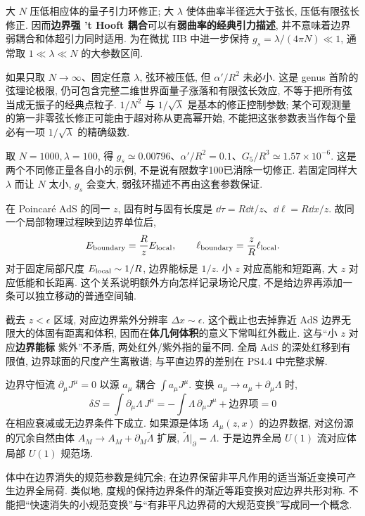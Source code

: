 大 $N$ 压低相应体的量子引力环修正; 大 $\lambda$ 使体曲率半径远大于弦长, 压低有限弦长修正. 因而\textbf{边界强 't Hooft 耦合}可以有\textbf{弱曲率的经典引力描述}, 并不意味着边界弱耦合和体超引力同时适用. 为在微扰 IIB 中进一步保持 $g_s=\lambda/(4\pi N)\ll1$, 通常取 $1\ll\lambda\ll N$ 的大参数区间.

如果只取 $N\to\infty$、固定任意 $\lambda$, 弦环被压低, 但 $\alpha'/R^2$ 未必小. 这是 genus 首阶的弦理论极限, 仍可包含完整二维世界面量子涨落和有限弦长效应, 不等于把所有弦当成无振子的经典点粒子. $1/N^2$ 与 $1/\sqrt\lambda$ 是基本的修正控制参数; 某个可观测量的第一非零弦长修正可能由于超对称从更高幂开始, 不能把这张参数表当作每个量必有一项 $1/\sqrt\lambda$ 的精确级数.

\begin{example}
取 $N=1000,\lambda=100$, 得 $g_s\simeq0.00796$、$\alpha'/R^2=0.1$、$G_5/R^3\simeq1.57\times10^{-6}$. 这是两个不同修正量各自小的示例, 不是说有限数字100已消除一切修正. 若固定同样大 $\lambda$ 而让 $N$ 太小, $g_s$ 会变大, 弱弦环描述不再由这套参数保证.
\end{example}

在 Poincaré AdS 的同一 $z$, 固有时与固有长度是 $\dd\tau=R\dd t/z$、$\dd\ell=R\dd x/z$. 故同一个局部物理过程映到边界单位后,
\[
E_{\rm boundary}=\frac RzE_{\rm local},\qquad
\ell_{\rm boundary}=\frac zR\ell_{\rm local}.
\]
对于固定局部尺度 $E_{\rm local}\sim1/R$, 边界能标是 $1/z$. 小 $z$ 对应高能和短距离, 大 $z$ 对应低能和长距离. 这个关系说明额外方向怎样记录场论尺度, 不是给边界再添加一条可以独立移动的普通空间轴.

截去 $z<\epsilon$ 区域, 对应边界紫外分辨率 $\Delta x\sim\epsilon$. 这个截止也去掉靠近 AdS 边界无限大的体固有距离和体积, 因而在\textbf{体几何体积}的意义下常叫红外截止. 这与“小 $z$ 对应\textbf{边界能标} 紫外”不矛盾, 两处红外/紫外指的量不同. 全局 AdS 的深处红移到有限值, 边界球面的尺度产生离散谱; 与平直边界的差别在 PS4.4 中完整求解.

边界守恒流 $\partial_\mu J^\mu=0$ 以源 $a_\mu$ 耦合 $\int a_\mu J^\mu$. 变换 $a_\mu\to a_\mu+\partial_\mu\Lambda$ 时,
\[
\delta S=\int\partial_\mu\Lambda\,J^\mu
=-\int\Lambda\,\partial_\mu J^\mu+\text{边界项}=0
\]
在相应衰减或无边界条件下成立. 如果源是体场 $A_\mu(z,x)$ 的边界数据, 对这份源的冗余自然由体 $A_M\to A_M+\partial_M\widetilde\Lambda$ 扩展, $\widetilde\Lambda|_{\partial}=\Lambda$. 于是边界全局 $U(1)$ 流对应体局部 $U(1)$ 规范场.

体中在边界消失的规范参数是纯冗余; 在边界保留非平凡作用的适当渐近变换可产生边界全局荷. 类似地, 度规的保持边界条件的渐近等距变换对应边界共形对称. 不能把“快速消失的小规范变换”与“有非平凡边界荷的大规范变换”写成同一个概念.

